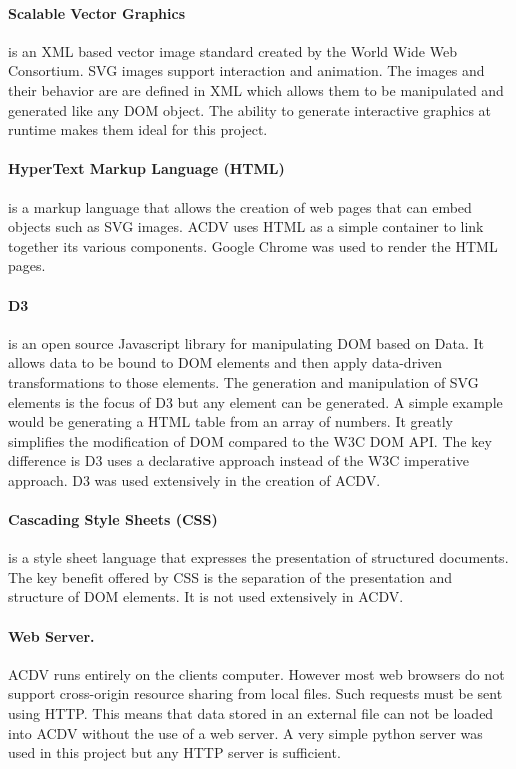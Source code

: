 \documentclass[a4paper, 11pt, titlepage, onehalfspacing]{report}
\begin{document}
\paragraph{Scalable Vector Graphics}is an XML based vector image standard created by the World Wide Web Consortium. SVG images support interaction and animation. The images and their behavior are are defined in XML which allows them to be manipulated and generated like any DOM object. The ability to generate interactive graphics at runtime makes them ideal for this project.

\paragraph{HyperText Markup Language (HTML)}is a markup language that allows the creation of web pages that can embed objects such as SVG images. AC\lightning{}DV uses HTML as a simple container to link together its various components. Google Chrome was used to render the HTML pages.

\paragraph{D3}is an open source Javascript library for manipulating DOM based on Data. It allows data to be bound to DOM elements and then apply data-driven transformations to those elements. The generation and manipulation of SVG elements is the focus of D3 but any element can be generated. A simple example would be generating a HTML table from an array of numbers. It greatly simplifies the modification of DOM compared to the W3C DOM API. The key difference is D3 uses a declarative approach instead of the W3C imperative approach. D3 was used extensively in the creation of AC\lightning{}DV.

\paragraph{Cascading Style Sheets (CSS)}is a style sheet language that expresses the presentation of structured documents. The key benefit offered by CSS is the separation of the presentation and structure of DOM elements. It is not used extensively in AC\lightning{}DV.

\paragraph{Web Server.} AC\lightning{}DV runs entirely on the clients computer. However most web browsers do not support cross-origin resource sharing from local files. Such requests must be sent using HTTP. This means that data stored in an external file can not be loaded into AC\lightning{}DV without the use of a web server. A very simple python server was used in this project but any HTTP server is sufficient. 
\end{document}
